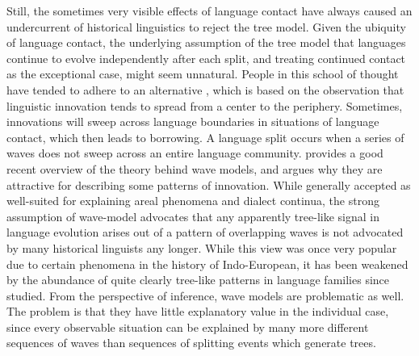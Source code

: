 Still, the sometimes very visible effects of language contact have always caused an undercurrent of historical linguistics to reject the tree model. Given the ubiquity of language contact, the underlying assumption of the tree model that languages continue to evolve independently after each split, and treating continued contact as the exceptional case, might seem unnatural. People in this school of thought have tended to adhere to an alternative , which is based on the observation that linguistic innovation tends to spread from a center to the periphery. Sometimes, innovations will sweep across language boundaries in situations of language contact, which then leads to borrowing. A language split occurs when a series of waves does not sweep across an entire language community. \citet{francois2014} provides a good recent overview of the theory behind wave models, and argues why they are attractive for describing some patterns of innovation. While generally accepted as well-suited for explaining areal phenomena and dialect continua, the strong assumption of wave-model advocates that any apparently tree-like signal in language evolution arises out of a pattern of overlapping waves is not advocated by many historical linguists any longer. While this view was once very popular due to certain phenomena in the history of Indo-European, it has been weakened by the abundance of quite clearly tree-like patterns in language families since studied. From the perspective of inference, wave models are problematic as well. The problem is that they have little explanatory value in the individual case, since every observable situation can be explained by many more different sequences of waves than sequences of splitting events which generate trees.

